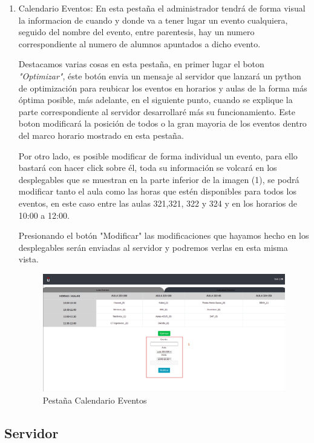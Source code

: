 \documentclass[a4paper, 12pt]{book}
\begin{document}
\begin{enumerate}
	\item Calendario Eventos: En esta pestaña el administrador tendrá de forma visual la informacion de cuando y donde va a tener lugar un evento cualquiera, seguido del nombre del evento, entre parentesis, hay un numero correspondiente al numero de alumnos apuntados a dicho evento.
	
	Destacamos varias cosas en esta pestaña, en primer lugar el boton \textit{"Optimizar"}, éste botón envia un mensaje al servidor que lanzará un python de optimización para reubicar los eventos en horarios y aulas de la forma más óptima posible, más adelante, en el siguiente punto, cuando se explique la parte correspondiente al servidor desarrollaré más su funcionamiento. Este boton modificará la posición de todos o la gran mayoria de los eventos dentro del marco horario mostrado en esta pestaña.
	
	Por otro lado, es posible modificar de forma individual un evento, para ello bastará con hacer click sobre él, toda su información se volcará en los desplegables que se muestran en la parte inferior de la imagen (1), se podrá modificar tanto el aula como las horas que estén disponibles para todos los eventos, en este caso entre las aulas 321,321, 322 y 324 y en los horarios de 10:00 a 12:00. 
	
	Presionando el botón "Modificar" las modificaciones que hayamos hecho en los desplegables serán enviadas al servidor y podremos verlas en esta misma vista.
	
		\begin{figure}[H]
  	\centering
  	\includegraphics[width=16cm, keepaspectratio]{img/adminCalendario.png}
  	\caption{Pestaña Calendario Eventos}\label{fig:adminCalendario}
	\end{figure}
  
\end{enumerate}

\subsection{Servidor}
\end{document}
